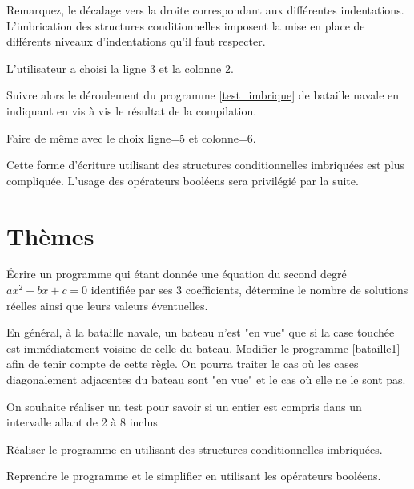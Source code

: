 Remarquez, le décalage vers la droite correspondant aux différentes indentations. L'imbrication des structures conditionnelles imposent la mise en place de différents niveaux d'indentations qu'il faut respecter.

\begin{Exercise}[title={Tester},counter={exo}]
L'utilisateur a choisi la ligne 3 et la colonne 2. 

Suivre alors le déroulement du programme \ref{test_imbrique} de bataille navale en indiquant en vis à vis le résultat de la compilation.

Faire de même avec le choix ligne=5 et colonne=6.
\end{Exercise}


Cette forme d'écriture utilisant des structures conditionnelles imbriquées est plus compliquée. L'usage des opérateurs booléens sera privilégié par la suite.

\section{Thèmes}

\begin{Exercise}[title={Écrire un programme},counter={exo}]
Écrire un programme qui étant donnée une équation du second degré $ax^2+bx+c=0$ identifiée par ses 3 coefficients, détermine le nombre de solutions réelles ainsi que leurs valeurs éventuelles.
\end{Exercise}

\begin{Exercise}[title={Modifier un programme},counter={exo}]
En général, à la bataille navale, un bateau n'est "en vue" que si la case touchée est immédiatement voisine de celle du bateau. Modifier le programme \ref{bataille1} afin de tenir compte de cette règle. On pourra traiter le cas où les cases diagonalement adjacentes du bateau sont "en vue" et le cas où elle ne le sont pas. 
\end{Exercise}

\begin{Exercise}[title={Écrire un programme},counter={exo}]
On souhaite réaliser un test pour savoir si un entier est compris dans un intervalle allant de 2 à 8 inclus

Réaliser le programme en utilisant des structures conditionnelles imbriquées.

Reprendre le programme et le simplifier en utilisant les opérateurs booléens.


\end{Exercise}

